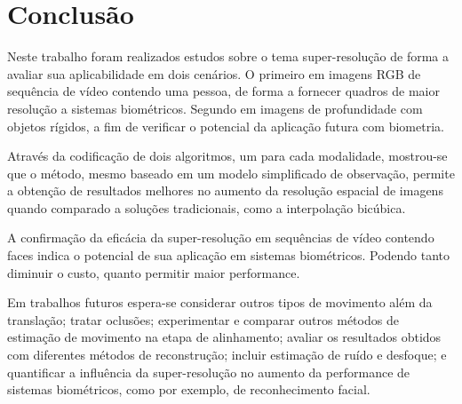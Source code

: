 \chapter{Conclusão}
\label{conclusao}

Neste trabalho foram realizados estudos sobre o tema super-resolução de forma a
avaliar sua aplicabilidade em dois cenários. O primeiro em imagens RGB de
sequência de vídeo contendo uma pessoa, de forma a fornecer quadros de maior
resolução a sistemas biométricos. Segundo em imagens de profundidade com
objetos rígidos, a fim de verificar o potencial da aplicação futura com
biometria.

Através da codificação de dois algoritmos, um para cada modalidade,
mostrou-se que o método, mesmo baseado em um modelo simplificado de observação,
permite a obtenção de resultados melhores no aumento da resolução espacial de
imagens quando comparado a soluções tradicionais, como a interpolação bicúbica.

A confirmação da eficácia da super-resolução em sequências de vídeo contendo
faces indica o potencial de sua aplicação em sistemas biométricos. Podendo
tanto diminuir o custo, quanto permitir maior performance.

Em trabalhos futuros espera-se considerar outros tipos de movimento além da
translação; tratar oclusões; experimentar e comparar outros métodos de
estimação de movimento na etapa de alinhamento; avaliar os resultados obtidos
com diferentes métodos de reconstrução; incluir estimação de ruído e desfoque;
e quantificar a influência da super-resolução no aumento da performance de
sistemas biométricos, como por exemplo, de reconhecimento facial.

